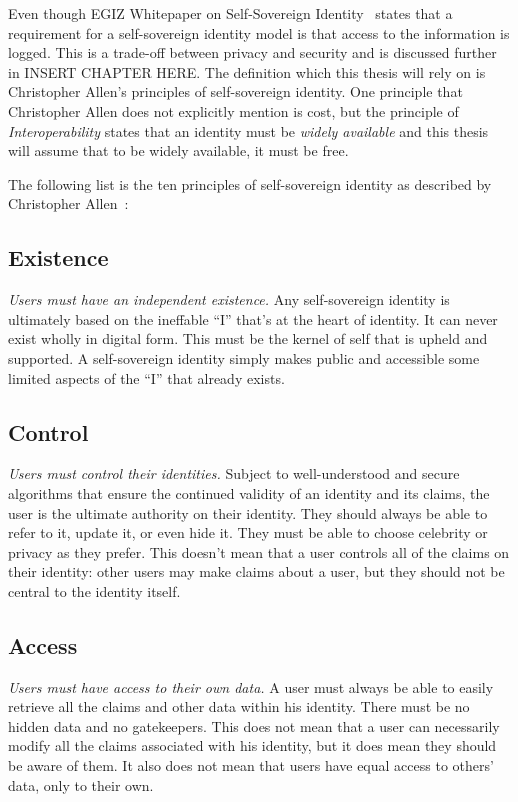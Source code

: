 Even though EGIZ Whitepaper on Self-Sovereign Identity~\cite{ssi} states that a requirement for a self-sovereign identity model is that access to the information is logged. This is a trade-off between privacy and security and is discussed further in INSERT CHAPTER HERE. The definition which this thesis will rely on is Christopher Allen's principles of self-sovereign identity. One principle that Christopher Allen does not explicitly mention is cost, but the principle of \textit{Interoperability} states that an identity must be \textit{widely available} and this thesis will assume that to be widely available, it must be free. 

The following list is the ten principles of self-sovereign identity as described by Christopher Allen~\cite{SSIPrinciples}:

\subsection{Existence} \textit{Users must have an independent existence.} Any self-sovereign identity is ultimately based on the ineffable “I” that’s at the heart of identity. It can never exist wholly in digital form. This must be the kernel of self that is upheld and supported. A self-sovereign identity simply makes public and accessible some limited aspects of the “I” that already exists.
\subsection{Control} \textit{Users must control their identities.} Subject to well-understood and secure algorithms that ensure the continued validity of an identity and its claims, the user is the ultimate authority on their identity. They should always be able to refer to it, update it, or even hide it. They must be able to choose celebrity or privacy as they prefer. This doesn’t mean that a user controls all of the claims on their identity: other users may make claims about a user, but they should not be central to the identity itself.
\subsection{Access} \textit{Users must have access to their own data.} A user must always be able to easily retrieve all the claims and other data within his identity. There must be no hidden data and no gatekeepers. This does not mean that a user can necessarily modify all the claims associated with his identity, but it does mean they should be aware of them. It also does not mean that users have equal access to others’ data, only to their own.
